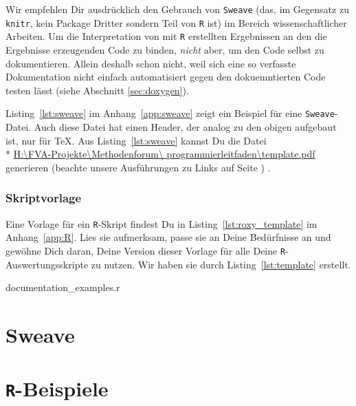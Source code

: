 \documentclass[twoside]{scrreprt}
\providecommand{\R}{\texttt{R}}
\providecommand{\code}[1]{\texttt{#1}}
\providecommand{\proot}{%
H:\textbackslash{}FVA-Projekte\textbackslash{}Methodenforum\textbackslash{}%
}
\providecommand{\pdir}{\proot{}programmierleitfaden\textbackslash{}}
\begin{document}
Wir empfehlen Dir ausdr\"u{}cklich den Gebrauch von \code{Sweave} (das, im
Gegensatz zu \code{knitr}, kein Package Dritter sondern Teil von \R{} ist) im
Bereich wissenschaftlicher Arbeiten.
Um die Interpretation von mit \R{} erstellten Ergebnissen an den die Ergebnisse
erzeugenden Code zu binden, \emph{nicht} aber, um den Code selbst zu
dokumentieren.
Allein deshalb schon nicht, weil sich eine so verfasste Dokumentation nicht
einfach automatisiert gegen den dokuemntierten Code testen l\"a{}sst (siehe
Abschnitt \ref{sec:doxygen}).

Listing~\ref{lst:sweave} im Anhang~\ref{app:sweave} zeigt ein Beispiel
f\"u{}r eine \code{Sweave}-Datei.
Auch diese Datei hat einen Header, der analog zu den obigen aufgebaut ist, nur
f\"u{}r \TeX{}.
Aus  Listing~\ref{lst:sweave} kannst Du die Datei \\*
\href{%
template.pdf}{%
\pdir{}template.pdf} 
generieren
(beachte unsere Ausf\"u{}hrungen zu Links auf Seite \pageref{page:links})
.

\subsection{Skriptvorlage
 }
Eine Vorlage f\"ur ein \R{}-Skript findest Du in Listing~\ref{lst:roxy_template}
im Anhang~\ref{app:R}.
Lies sie aufmerksam, passe sie an Deine Bed\"u{}rfnisse an und gew\"o{}hne Dich
daran, Deine Version dieser Vorlage f\"u{}r alle Deine \R{}-Auswertungsskripte
zu nutzen.
Wir haben sie durch Listing~\ref{lst:template} erstellt.

{documentation_examples.r}




\printindex
\appendix
\chapter{Sweave\label{app:sweave}}

\pagebreak
\chapter{\R{}-Beispiele\label{app:R}}

%
%
%
\end{document}
